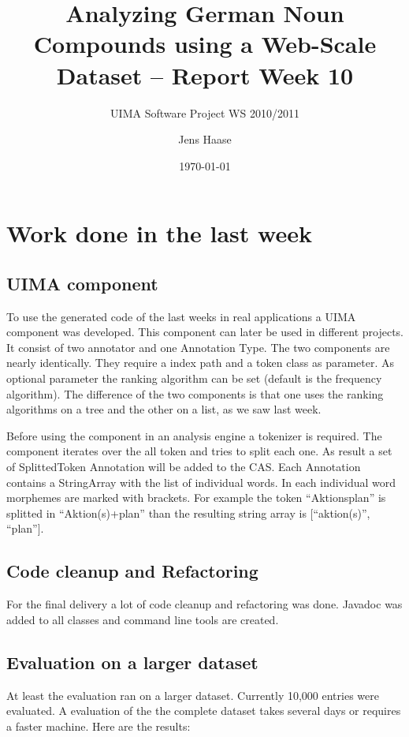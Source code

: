 \documentclass[11pt, accentcolor=tud9b, nochapname]{tudexercise}
\begin{document}
\author{Jens Haase}
\title{Analyzing German Noun Compounds using a
  Web-Scale Dataset -- Report Week 10}
\subtitle{UIMA Software Project WS 2010/2011}
\date{\today}
\maketitle

\section{Work done in the last week}

\subsection{UIMA component}
To use the generated code of the last weeks in real applications a UIMA component was developed. This component can later be used in different projects. It consist of two annotator and one Annotation Type. The two components are nearly identically. They require a index path and a token class as parameter. As optional parameter the ranking algorithm can be set (default is the frequency algorithm). The difference of the two components is that one uses the ranking algorithms on a tree and the other on a list, as we saw last week.

Before using the component in an analysis engine a tokenizer is required. The component iterates over the all token and tries to split each one. As result a set of SplittedToken Annotation will be added to the CAS. Each Annotation contains a StringArray with the list of individual words. In each individual word morphemes are marked with brackets. For example the token ``Aktionsplan'' is splitted in ``Aktion(s)+plan'' than the resulting string array is [``aktion(s)'', ``plan''].

\subsection{Code cleanup and Refactoring}
For the final delivery a lot of code cleanup and refactoring was done. Javadoc was added to all classes and command line tools are created.

\subsection{Evaluation on a larger dataset}
At least the evaluation ran on a larger dataset. Currently 10,000 entries were evaluated. A evaluation of the the complete dataset takes several days or requires a faster machine. Here are the results:
\end{document}
